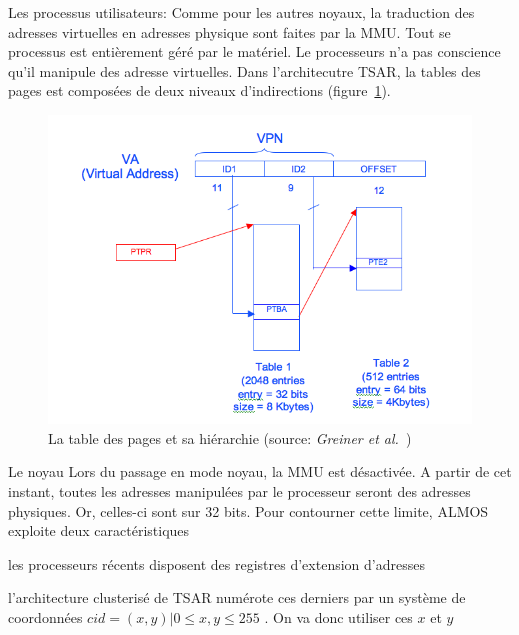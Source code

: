      \begin{paragraph}{Les processus utilisateurs:}
        Comme pour les autres noyaux, la traduction des adresses virtuelles en
        adresses physique sont faites par la MMU. Tout se processus est
        entièrement géré par le matériel. Le processeurs n'a pas conscience
        qu'il manipule des adresse virtuelles. Dans l'architecutre TSAR, la
        tables des pages est composées de deux niveaux d'indirections
        (figure~\ref{fig:page-table}).
        
        \begin{figure}
          \centering
          \includegraphics[scale=0.35]{include/img/pages_table_levels.png}
          \caption{La table des pages et sa hiérarchie (source: \textit{Greiner
              et al.}~\cite{tsar2008web})}
          \label{fig:page-table}
        \end{figure}
        
      \end{paragraph}
      \begin{paragraph}{Le noyau}
        Lors du passage en mode noyau, la MMU est désactivée. A partir de cet
        instant, toutes les adresses manipulées par le processeur seront des
        adresses physiques. Or, celles-ci sont sur 32 bits. Pour contourner
        cette limite, ALMOS exploite deux caractéristiques \benumline \item les
        processeurs récents disposent des registres d'extension d'adresses \item
        l'architecture clusterisé de TSAR numérote ces derniers par un système
        de coordonnées $cid = (x, y) | 0 \leq x,y \leq 255$ \eenumline. On va
        donc utiliser ces $x$ et $y$
      \end{paragraph}


